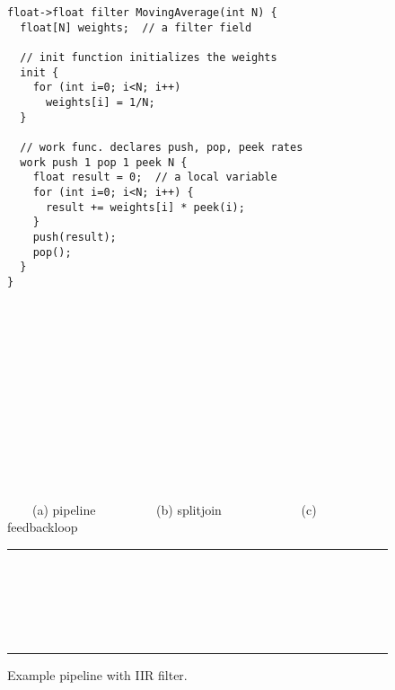 \begin{figure}[t]
\begin{minipage}{3.25in}
{\scriptsize
\begin{verbatim}
float->float filter MovingAverage(int N) {
  float[N] weights;  // a filter field

  // init function initializes the weights
  init {
    for (int i=0; i<N; i++)
      weights[i] = 1/N;
  }

  // work func. declares push, pop, peek rates
  work push 1 pop 1 peek N {
    float result = 0;  // a local variable
    for (int i=0; i<N; i++) {
      result += weights[i] * peek(i);
    }
    push(result);
    pop();
  }
}         
\end{verbatim}
\vspace{-18pt}
\caption{Example of a StreamIt filter.~~~~~~~\protect\label{fig:filter-example}}}
\end{minipage}
\vrule
\begin{minipage}{3.50in}
\begin{singlespace}

~~~~
\hspace{0.1in}\begin{minipage}{0.46in}
{\centering
{} \\
}
\end{minipage} 
~
\begin{minipage}{1.3in}
{\centering
{} \\
}
\end{minipage}
~
\begin{minipage}{1.02in}
{\centering
{} \\
}
\end{minipage}

~ \vspace{-6pt} \\ {\protect\footnotesize \mbox{~~~~}\hspace{0.1in}(a) pipeline ~~~~~~~~~(b) splitjoin ~~~~~~~~~~~~(c) feedbackloop}
\vspace{-6pt}
\caption{Structures supported by StreamIt.
\protect\label{fig:structures}}
\vspace{8pt}
\hrule
~~\hspace{0.2in}\begin{minipage}{3in}
\vspace{8pt}
~~~~

~ \\ \vspace{-49.5pt}
\caption{Example pipeline with IIR filter.~~\protect\label{fig:iir-pipeline}}
\end{minipage}
\vspace{6pt}
\end{singlespace}
\end{minipage}
\hrule
\end{figure}

